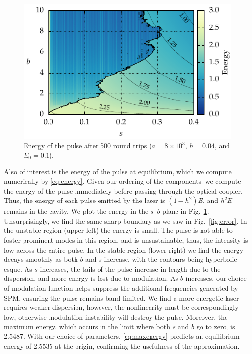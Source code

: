 \documentclass[9pt,twocolumn,twoside]{osajnl}
\begin{document}
\begin{figure}[tbp]
	\centering
	\includegraphics{Figures/ParamSpaceEnergy}
	\caption{Energy of the pulse after 500 round trips ($a = 8 \times 10^3$, $h = 0.04$, and $E_0 = 0.1$).}
	\label{fig:energy}
\end{figure}

Also of interest is the energy of the pulse at equilibrium, which we compute numerically by \eqref{eq:energy}. Given our ordering of the components, we compute the energy of the pulse immediately before passing through the optical coupler. Thus, the energy of each pulse emitted by the laser is $(1 - h^2) E$, and $h^2 E$ remains in the cavity. We plot the energy in the $s$--$b$ plane in Fig.~\ref{fig:energy}. Unsurprisingly, we find the same sharp boundary as we saw in Fig.~\ref{fig:error}. In the unstable region (upper-left) the energy is small. The pulse is not able to foster prominent modes in this region, and is unsustainable, thus, the intensity is low across the entire pulse. In the stable region (lower-right) we find the energy decays smoothly as both $b$ and $s$ increase, with the contours being hyperbolic-esque. As $s$ increases, the tails of the pulse increase in length due to the dispersion, and more energy is lost due to modulation. As $b$ increases, our choice of modulation function helps suppress the additional frequencies generated by SPM, ensuring the pulse remains band-limited. We find a more energetic laser requires weaker dispersion, however, the nonlinearity must be correspondingly low, otherwise modulation instability will destroy the pulse. Moreover, the maximum energy, which occurs in the limit where both $s$ and $b$ go to zero, is 2.5487. With our choice of parameters, \eqref{eq:maxenergy} predicts an equilibrium energy of 2.5535 at the origin, confirming the usefulness of the approximation.
\end{document}
